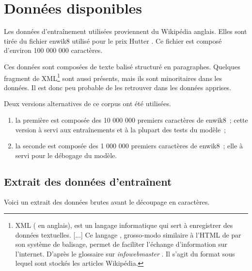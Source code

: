 \chapter{Données disponibles}
Les données d'entraînement utilisées proviennent du Wikipédia anglais.
Elles sont tirée du fichier \og enwik8\fg{} utilisé pour le prix Hutter \autocite{enwik8,Hutter2018Feb}. Ce fichier est composé d'environ 100 000 000 caractères.

Ces données sont composées de texte balisé structuré en paragraphes.
Quelques fragment de XML\footnote{XML ( en anglais), \og est un langage informatique qui sert à enregistrer des données textuelles. [...] Ce langage , grosso-modo similaire à l'HTML de par son système de balisage, permet de faciliter l'échange d'information sur l'internet.\fg{} D'après le glossaire sur \emph{infowebmaster} \autocite{xml}. Il s'agit du format sous lequel sont stockés les articles Wikipédia.}
sont aussi présents, mais ils sont minoritaires dans les données. Il est donc peu probable de les retrouver dans les données apprises.

Deux versions alternatives de ce corpus ont été utilisées.
\begin{enumerate}
	\item la première est composée des 10 000 000 premiers caractères de \og enwik8\fg{}~; cette version à servi aux entraînements et à la plupart des tests du modèle~; %
	\item la seconde est composée des 1 000 000 premiers caractères de \og enwik8\fg{}~; elle à servi pour le débogage du modèle. %
\end{enumerate}

\section{Extrait des données d'entraînent}
Voici un extrait des données brutes avant le découpage en caractères.

